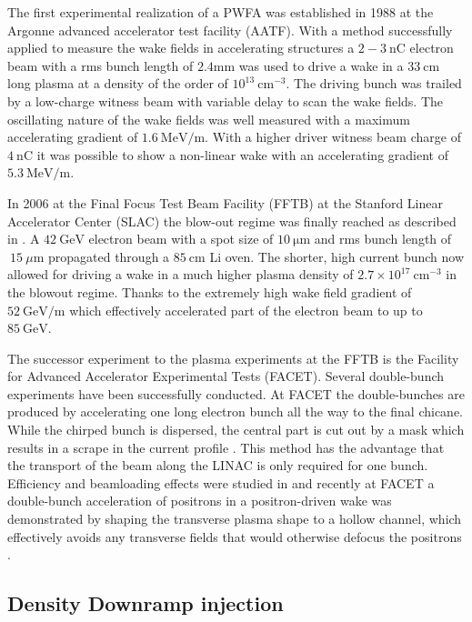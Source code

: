 The first experimental realization of a PWFA was established in 1988 at the Argonne advanced accelerator test facility (AATF)\cite{rosenzweig1988experimental}. With a method successfully applied to measure the wake fields in accelerating structures
a $2-3\ \mathrm{nC}$ electron beam with a rms bunch length of $2.4 \mathrm{mm}$ was used to drive a wake in a $33\ \mathrm{cm} $ long plasma at a density of the order of $ 10^{13}\ \mathrm{cm}^{-3}$. The driving bunch was trailed by a low-charge witness beam with variable delay to scan the wake fields.
The oscillating nature of the wake fields was well measured with a maximum accelerating gradient of $1.6\ \mathrm{MeV/m}$. 
With a higher driver witness beam charge of $4\ \mathrm{nC}$ \cite{figueroa1988direct} it was possible to show a non-linear wake with an accelerating gradient of $5.3\ \mathrm{MeV/m}$. 

In 2006 at the Final Focus Test Beam Facility (FFTB) at the Stanford Linear Accelerator Center (SLAC) the blow-out regime was finally reached as described in \cite{blumenfeld2007energyDoubling}.
A $42\ \mathrm{GeV}$ electron beam with a spot size of $10\ \mathrm{\mu m}$ and rms bunch length of $~15\ \mu\mathrm{m}$ propagated through a $85\ \mathrm{cm}$ Li oven. The shorter, high current bunch now allowed for driving a wake in a much higher plasma density of $2.7\times 10^{17}\ \mathrm{cm}^{-3} $ in the blowout regime. Thanks to the extremely high wake field gradient of $52\ \mathrm{GeV/m}$ which effectively accelerated part of the electron beam to up to $85\ \mathrm{GeV}$.

The successor experiment to the plasma experiments at the FFTB is the Facility for Advanced Accelerator Experimental Tests (FACET)\cite{clarke2012facet}. Several double-bunch experiments have been successfully conducted.  
At FACET the double-bunches are produced by accelerating one long electron bunch all the way to the final chicane. 
While the chirped bunch is dispersed, the central part is cut out by a mask which results in a scrape in the current profile  \cite{hogan2010FACET}. This method has the advantage that the transport of the beam along the LINAC is only required for one bunch.
Efficiency and beamloading effects were studied in \cite{litos2014high} and recently at FACET a double-bunch acceleration of positrons in a positron-driven wake was demonstrated by shaping the transverse plasma shape to a hollow channel, which effectively avoids any transverse fields that would otherwise defocus the positrons \cite{ThesisGessner}.
\subsection{Density Downramp injection}


